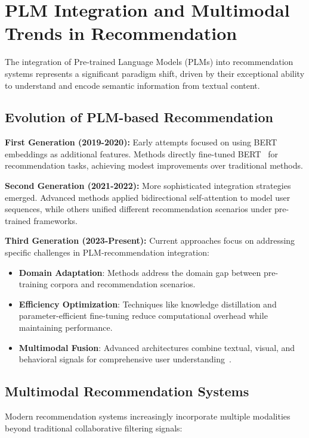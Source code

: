 \section{PLM Integration and Multimodal Trends in Recommendation}

The integration of Pre-trained Language Models (PLMs) into recommendation systems represents a significant paradigm shift, driven by their exceptional ability to understand and encode semantic information from textual content.

\subsection{Evolution of PLM-based Recommendation}

\textbf{First Generation (2019-2020):} Early attempts focused on using BERT embeddings as additional features. Methods directly fine-tuned BERT~\cite{devlin2019bert} for recommendation tasks, achieving modest improvements over traditional methods.

\textbf{Second Generation (2021-2022):} More sophisticated integration strategies emerged. Advanced methods applied bidirectional self-attention to model user sequences, while others unified different recommendation scenarios under pre-trained frameworks.

\textbf{Third Generation (2023-Present):} Current approaches focus on addressing specific challenges in PLM-recommendation integration:
\begin{itemize}
    \item \textbf{Domain Adaptation}: Methods address the domain gap between pre-training corpora and recommendation scenarios.
    \item \textbf{Efficiency Optimization}: Techniques like knowledge distillation and parameter-efficient fine-tuning reduce computational overhead while maintaining performance.
    \item \textbf{Multimodal Fusion}: Advanced architectures combine textual, visual, and behavioral signals for comprehensive user understanding~\cite{wang2021multimodal}.
\end{itemize}

\subsection{Multimodal Recommendation Systems}

Modern recommendation systems increasingly incorporate multiple modalities beyond traditional collaborative filtering signals:

